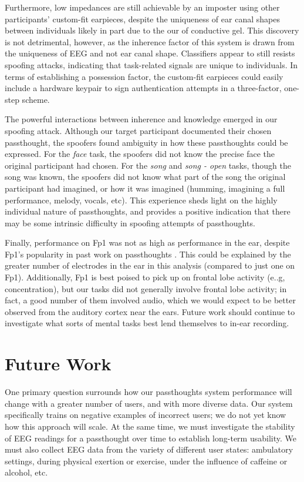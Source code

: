 \documentclass{sigchi}
\begin{document}
Furthermore, low impedances are still achievable by an imposter using other participants' custom-fit earpieces, despite the uniqueness of ear canal shapes between individuals \cite{Akkermans2005} likely in part due to the our of conductive gel. This discovery is not detrimental, however, as the inherence factor of this system is drawn from the uniqueness of EEG and not ear canal shape. Classifiers appear to still resists spoofing attacks, indicating that task-related signals are unique to individuals. In terms of establishing a possession factor, the custom-fit earpieces could easily include a hardware keypair to sign authentication attempts in a three-factor, one-step scheme.

The powerful interactions between inherence and knowledge emerged in our spoofing attack. Although our target participant documented their chosen passthought, the spoofers found ambiguity in how these passthoughts could be expressed. For the \textit{face} task, the spoofers did not know the precise face the original participant had chosen. For the \textit{song} and \textit{song - open} tasks, though the song was known, the spoofers did not know what part of the song the original participant had imagined, or how it was imagined (humming, imagining a full performance, melody, vocals, etc). This experience sheds light on the highly individual nature of passthoughts, and provides a positive indication that there may be some intrinsic difficulty in spoofing attempts of passthoughts.

Finally, performance on Fp1 was not as high as performance in the ear, despite Fp1's popularity in past work on passthoughts \cite{Chuang2013b}. This could be explained by the greater number of electrodes in the ear in this analysis (compared to just one on Fp1). Additionally, Fp1 is best poised to pick up on frontal lobe activity (e..g, concentration), but our tasks did not generally involve frontal lobe activity; in fact, a good number of them involved audio, which we would expect to be better observed from the auditory cortex near the ears. Future work should continue to investigate what sorts of mental tasks best lend themselves to in-ear recording.

\section{Future Work}

One primary question surrounds how our passthoughts system performance will change with a greater number of users, and with more diverse data. Our system specifically trains on negative examples of incorrect users; we do not yet know how this approach will scale. At the same time, we must investigate the stability of EEG readings for a passthought over time to establish long-term usability. We must also collect EEG data from the variety of different user states: ambulatory settings, during physical exertion or exercise, under the influence of caffeine or alcohol, etc.
\end{document}
